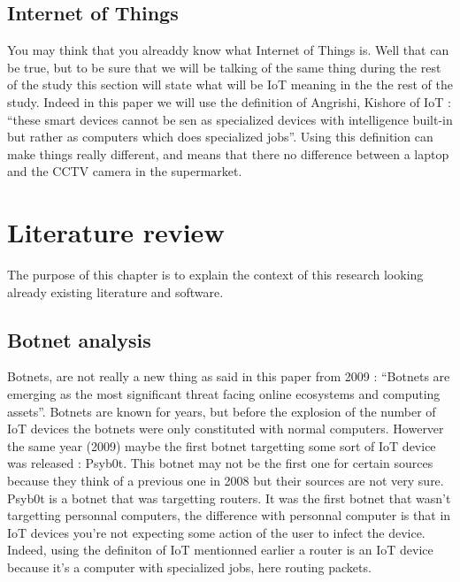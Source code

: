 \documentclass{report}
\begin{document}
\section{Internet of Things}
You may think that you alreaddy know what Internet of Things is. Well that can be true, but to be sure that we will be talking of the same thing during the rest of the study this section will state what will be IoT meaning in the the rest of the study. Indeed in this paper we will use the definition of Angrishi, Kishore\autocite{angrishi2017turning} of IoT : ``these smart devices cannot be sen as specialized devices with intelligence built-in but rather as computers which does specialized jobs''. Using this definition can make things really different, and means that there no difference between a laptop and the CCTV camera in the supermarket.

\chapter{Literature review}
The purpose of this chapter is to explain the context of this research looking already existing literature and software.\newline
\newline

\section{Botnet analysis}
Botnets, are not really a new thing as said in this paper from 2009\autocite{feily2009survey} : ``Botnets are emerging as the most significant threat facing online ecosystems and computing assets''. Botnets are known for years, but before the explosion of the number of IoT devices the botnets were only constituted with normal computers. Howerver the same year (2009) maybe the first botnet targetting some sort of IoT device was released : Psyb0t\autocite{durfina2013psybot}. This botnet may not be the first one for certain sources\autocite{angrishi2017turning} because they think of a previous one in 2008 but their sources are not very sure. Psyb0t is a botnet that was targetting routers. It was the first botnet that wasn't targetting personnal computers, the difference with personnal computer is that in IoT devices you're not expecting some action of the user to infect the device. Indeed, using the definiton of IoT mentionned earlier a router is an IoT device because it's a computer with specialized jobs, here routing packets.
\end{document}
